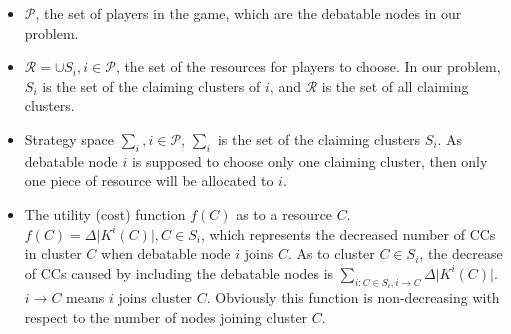 \documentclass[times]{ettauth}
\theoremstyle{mytheoremstyle}
\theoremstyle{mytheoremstyle}
\theoremstyle{mytheoremstyle}
\begin{document}
\begin{itemize}
	\item $\mathcal{P}$, the set of players in the game, which are the debatable nodes in our problem.
	\item $\mathcal{R} = \cup S_i, i\in \mathcal{P}$, the set of the resources for players to choose. In our problem, $S_i$ is the set of the claiming clusters of $i$, and $\mathcal{R}$ is the set of all claiming clusters.
	\item Strategy space $\sum_i, i \in \mathcal{P}$, $\sum_i$ is the set of the claiming clusters $S_i$.
	As debatable node $i$ is supposed to choose only one claiming cluster, then only one piece of resource will be allocated to $i$.%
	
	
	\item %
	The utility (cost) function $f(C)$ as to a resource $C$. 
	$f(C) = \Delta\vert K^i(C)|, C\in S_i$, which represents the decreased number of CCs in cluster $C$ when debatable node $i$ joins $C$.
	As to cluster $C\in S_i$, the decrease of CCs caused by including the debatable nodes is $\sum_{i:C\in S_i, i\rightarrow C} \Delta\vert K^i(C) \vert$. 
$i\rightarrow C$ means $i$ joins cluster $C$.
Obviously this function is non-decreasing with respect to the number of nodes joining cluster $C$.
	

\end{itemize}
\end{document}
